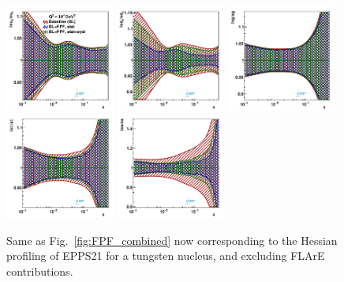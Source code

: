 \begin{figure}[t]
\centering
\includegraphics[width=0.32\textwidth]{plots/nuclear_fpf/fred05fcorr05_FPF_q2_10000_pdf_uv_ratio.pdf}
\includegraphics[width=0.32\textwidth]{plots/nuclear_fpf/fred05fcorr05_FPF_q2_10000_pdf_dv_ratio.pdf}
\includegraphics[width=0.32\textwidth]{plots/nuclear_fpf/fred05fcorr05_FPF_q2_10000_pdf_g_ratio.pdf}\\
\includegraphics[width=0.32\textwidth]{plots/nuclear_fpf/fred05fcorr05_FPF_q2_10000_pdf_Sea_ratio.pdf}
\includegraphics[width=0.32\textwidth]{plots/nuclear_fpf/fred05fcorr05_FPF_q2_10000_pdf_s_ratio.pdf}
\caption{Same as Fig.~\ref{fig:FPF_combined} now corresponding to the Hessian
 profiling of EPPS21 for a tungsten nucleus, and excluding FLArE contributions.
}
\label{fig:profiling_FPF_nuclear}
\end{figure}

